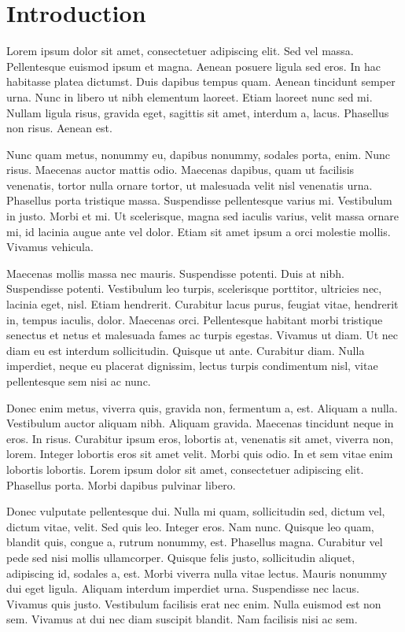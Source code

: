 \chapter{Introduction}

Lorem ipsum dolor sit amet, consectetuer adipiscing elit. Sed vel massa. Pellentesque euismod ipsum et magna. Aenean posuere ligula sed eros. In hac habitasse platea dictumst. Duis dapibus tempus quam. Aenean tincidunt semper urna. Nunc in libero ut nibh elementum laoreet. Etiam laoreet nunc sed mi. Nullam ligula risus, gravida eget, sagittis sit amet, interdum a, lacus. Phasellus non risus. Aenean est.

Nunc quam metus, nonummy eu, dapibus nonummy, sodales porta, enim. Nunc risus. Maecenas auctor mattis odio. Maecenas dapibus, quam ut facilisis venenatis, tortor nulla ornare tortor, ut malesuada velit nisl venenatis urna. Phasellus porta tristique massa. Suspendisse pellentesque varius mi. Vestibulum in justo. Morbi et mi. Ut scelerisque, magna sed iaculis varius, velit massa ornare mi, id lacinia augue ante vel dolor. Etiam sit amet ipsum a orci molestie mollis. Vivamus vehicula.

Maecenas mollis massa nec mauris. Suspendisse potenti. Duis at nibh. Suspendisse potenti. Vestibulum leo turpis, scelerisque porttitor, ultricies nec, lacinia eget, nisl. Etiam hendrerit. Curabitur lacus purus, feugiat vitae, hendrerit in, tempus iaculis, dolor. Maecenas orci. Pellentesque habitant morbi tristique senectus et netus et malesuada fames ac turpis egestas. Vivamus ut diam. Ut nec diam eu est interdum sollicitudin. Quisque ut ante. Curabitur diam. Nulla imperdiet, neque eu placerat dignissim, lectus turpis condimentum nisl, vitae pellentesque sem nisi ac nunc.

Donec enim metus, viverra quis, gravida non, fermentum a, est. Aliquam a nulla. Vestibulum auctor aliquam nibh. Aliquam gravida. Maecenas tincidunt neque in eros. In risus. Curabitur ipsum eros, lobortis at, venenatis sit amet, viverra non, lorem. Integer lobortis eros sit amet velit. Morbi quis odio. In et sem vitae enim lobortis lobortis. Lorem ipsum dolor sit amet, consectetuer adipiscing elit. Phasellus porta. Morbi dapibus pulvinar libero.

Donec vulputate pellentesque dui. Nulla mi quam, sollicitudin sed, dictum vel, dictum vitae, velit. Sed quis leo. Integer eros. Nam nunc. Quisque leo quam, blandit quis, congue a, rutrum nonummy, est. Phasellus magna. Curabitur vel pede sed nisi mollis ullamcorper. Quisque felis justo, sollicitudin aliquet, adipiscing id, sodales a, est. Morbi viverra nulla vitae lectus. Mauris nonummy dui eget ligula. Aliquam interdum imperdiet urna. Suspendisse nec lacus. Vivamus quis justo. Vestibulum facilisis erat nec enim. Nulla euismod est non sem. Vivamus at dui nec diam suscipit blandit. Nam facilisis nisi ac sem.
